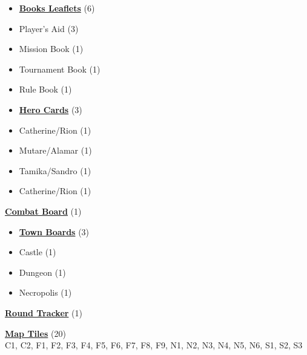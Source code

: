 

\begin{multicols}{3}

\small

\begin{itemize}[leftmargin=0pt, label={}, noitemsep, noitemsep]
  \item \textbf{\underline{Books Leaflets}} (6)
  \item Player's Aid (3)
  \item Mission Book (1)
  \item Tournament Book (1)
  \item Rule Book (1)
\end{itemize}

\begin{itemize}[leftmargin=0pt, label={}, noitemsep, noitemsep]
  \item \textbf{\underline{Hero Cards}} (3)
  \item Catherine/Rion (1)
  \item Mutare/Alamar (1)
  \item Tamika/Sandro (1)
  \item Catherine/Rion (1)
\end{itemize}

\textbf{\underline{Combat Board}} (1)

\begin{itemize}[leftmargin=0pt, label={}, noitemsep, noitemsep]
  \item \textbf{\underline{Town Boards}} (3)
  \item Castle (1)
  \item Dungeon (1)
  \item Necropolis (1)
\end{itemize}

\textbf{\underline{Round Tracker}} (1)

\textbf{\underline{Map Tiles}} (20)\\
C1, C2, F1, F2, F3, F4, F5, F6, F7, F8, F9, N1, N2, N3, N4, N5, N6, S1, S2, S3


\end{multicols}
